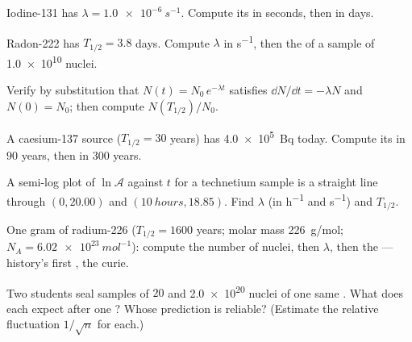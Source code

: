 \begin{exercise}[$\star$]\label{exo:g12:radioactive-decay:1}
Iodine-131 has $\lambda = \qty{1.0e-6}{s^{-1}}$. Compute its  in
seconds, then in days.
\end{exercise}

\begin{exercise}[$\star$]\label{exo:g12:radioactive-decay:2}
Radon-222 has $T_{1/2} = 3.8$ days. Compute $\lambda$ in \unit{s^{-1}},
then the  of a sample of \num{1.0e10} nuclei.
\end{exercise}

\begin{exercise}[$\star$]\label{exo:g12:radioactive-decay:3}
Verify by substitution that $N(t) = N_0\,e^{-\lambda t}$ satisfies
$\dd N/\dd t = -\lambda N$ and $N(0) = N_0$; then compute $N(T_{1/2})/N_0$.
\end{exercise}

\begin{exercise}[$\star$]\label{exo:g12:radioactive-decay:4}
A caesium-137 source ($T_{1/2} = 30$ years) has  \qty{4.0e5}{Bq}
today. Compute its  in $90$ years, then in $300$ years.
\end{exercise}

\begin{exercise}[$\star$]\label{exo:g12:radioactive-decay:5}
A semi-log plot of $\ln \mathcal A$ against $t$ for a technetium sample is
a straight line through $(0, 20.00)$ and $(\qty{10}{hours}, 18.85)$. Find
$\lambda$ (in \unit{h^{-1}} and \unit{s^{-1}}) and $T_{1/2}$.
\end{exercise}

\begin{exercise}[$\star\star$]\label{exo:g12:radioactive-decay:6}
One gram of radium-226 ($T_{1/2} = 1600$ years; molar mass
\qty{226}{g/mol}; $N_A = \qty{6.02e23}{mol^{-1}}$): compute the number of
nuclei, then $\lambda$, then the  --- history's first 
, the curie.
\end{exercise}

\begin{exercise}[$\star\star$]\label{exo:g12:radioactive-decay:7}
Two students seal samples of $20$ and \num{2.0e20} nuclei of one same
. What does each expect after one ? Whose prediction is
reliable? (Estimate the relative fluctuation $1/\sqrt n$ for each.)
\end{exercise}

